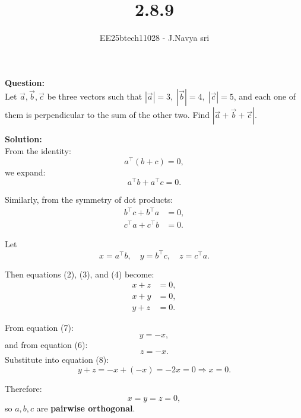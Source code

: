 \documentclass[journal]{IEEEtran}
\begin{document}

\vspace{3cm}

\title{2.8.9}
\author{EE25btech11028 - J.Navya sri}
{\let\newpage\relax\maketitle}


\textbf{Question:} \\
Let $\vec{a}, \vec{b}, \vec{c}$ be three vectors such that 
$|\vec{a}|=3,\; |\vec{b}|=4,\; |\vec{c}|=5$, and each one of them is perpendicular to the sum of the other two. 
Find $|\vec{a}+\vec{b}+\vec{c}|$.

\bigskip

\textbf{Solution:} \\
From the identity:
\begin{equation} \label{eq1}
a^\top(b + c) = 0,
\end{equation}
we expand:
\begin{equation} \label{eq2}
a^\top b + a^\top c = 0.
\end{equation}

Similarly, from the symmetry of dot products:
\begin{align}
b^\top c + b^\top a &= 0, \label{eq3} \\
c^\top a + c^\top b &= 0. \label{eq4}
\end{align}

Let
\begin{equation} \label{eq5}
x = a^\top b, \quad y = b^\top c, \quad z = c^\top a.
\end{equation}

Then equations (2), (3), and (4) become:
\begin{align}
x + z &= 0, \label{eq6} \\
x + y &= 0, \label{eq7} \\
y + z &= 0. \label{eq8}
\end{align}

From equation (7):
\[
y = -x,
\]
and from equation (6):
\[
z = -x.
\]
Substitute into equation (8):
\[
y + z = -x + (-x) = -2x = 0 \Rightarrow x = 0.
\]

Therefore:
\begin{equation} \label{eq9}
x = y = z = 0,
\end{equation}
so \( a, b, c \) are \textbf{pairwise orthogonal}.
\end{document}
